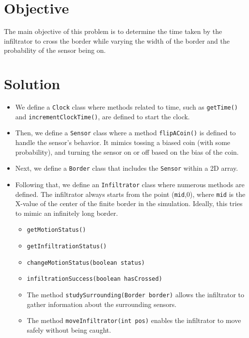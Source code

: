 \documentclass[12pt,a4paper]{article}
\begin{document}
\section{Objective}\label{sec:objective}
The main objective of this problem is to determine the time taken by the infiltrator to cross the border while varying the width of the border and the probability of the sensor being on.

\section{Solution }\label{sec:discussion}
\begin{itemize}
\item We define a \texttt{Clock} class where methods related to time, such as \texttt{getTime()} and \texttt{incrementClockTime()}, are defined to start the clock.


\item Then, we define a \texttt{Sensor} class where a method \texttt{flipACoin()} is defined to handle the sensor's behavior. It mimics tossing a biased coin (with some probability), and turning the sensor on or off based on the bias of the coin.


\item Next, we define a \texttt{Border} class that includes the \texttt{Sensor} within a 2D array.

\item Following that, we define an \texttt{Infiltrator} class where numerous methods are defined. The infiltrator always starts from the point (\texttt{mid},0), where \texttt{mid} is the X-value of the center of the finite border in the simulation. Ideally, this tries to mimic an infinitely long border.

    \begin{itemize}
        \item \texttt{getMotionStatus()}
        \item \texttt{getInfiltrationStatus()}
        \item \texttt{changeMotionStatus(boolean status)}
        \item \texttt{infiltrationSuccess(boolean hasCrossed)}
    
    \item The method \texttt{studySurrounding(Border border)} allows the infiltrator to gather information about the surrounding sensors.
    \item The method \texttt{moveInfiltrator(int pos)} enables the infiltrator to move safely without being caught.
    \end{itemize}
\end{itemize}
\end{document}
